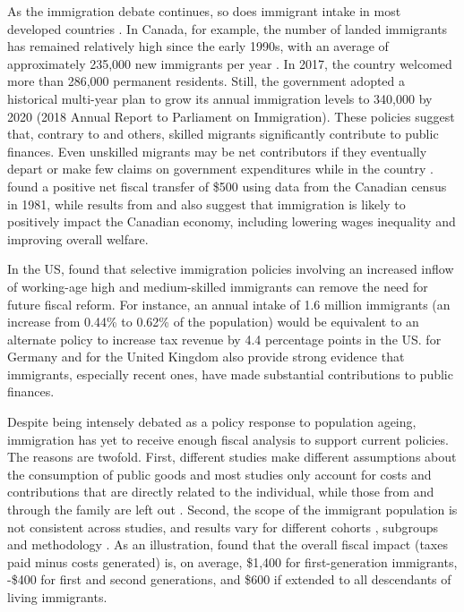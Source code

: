 \vspace{0.7em}\par
As the immigration debate continues, so does immigrant intake in most developed countries \citep{Card:2016ku}.
In Canada, for example, the number of landed immigrants has remained relatively high since the early 1990s, with an average of approximately 235,000 new immigrants per year \citep{StatistiqueCanada:2016ud}.
In 2017, the country welcomed more than 286,000 permanent residents. Still, the government adopted a historical multi-year plan to grow its annual immigration levels to 340,000 by 2020 (2018 Annual Report to Parliament on Immigration).
These policies suggest that, contrary to \citet{Borjas:2014hr} and others, skilled migrants significantly contribute to public finances. Even unskilled migrants may be net contributors if they eventually depart or make few claims on government expenditures while in the country \citep{Rowthorn:2008kk}.
\citet{Akbari:1989fh} found a positive net fiscal transfer of \$500 using data from the Canadian census in 1981, while results from \citet{Ileri:2019hf} and \citet{Dungan:2013jp} also suggest that immigration is likely to positively impact the Canadian economy, including lowering wages inequality and improving overall welfare.

\vspace{0.7em}\par
In the US, \citet{Storesletten:2000cn} found that selective immigration policies involving an increased inflow of working-age high and medium-skilled immigrants can remove the need for future fiscal reform.
For instance, an annual intake of 1.6 million immigrants (an increase from 0.44\% to 0.62\% of the population) would be equivalent to an alternate policy to increase tax revenue by 4.4 percentage points in the US.
\citet{Akin:2012gh} for Germany and \citet{Dustmann:2014dr} for the United Kingdom also provide strong evidence that immigrants, especially recent ones, have made substantial contributions to public finances.

\vspace{0.7em}\par
Despite being intensely debated as a policy response to population ageing, immigration has yet to receive enough fiscal analysis to support current policies.
The reasons are twofold.
First, different studies make different assumptions about the consumption of public goods \citep{Grubel:2012wo} and most studies only account for costs and contributions that are directly related to the individual, while those from and through the family are left out \citep{dAlbis:2019de}.
Second, the scope of the immigrant population is not consistent across studies, and results vary for different cohorts \citep{Grubel:2012wo}, subgroups and methodology \citep{Chojnicki:2011vu}.
As an illustration, \citet{Lee:1998fs} found that the overall fiscal impact (taxes paid minus costs generated) is, on average, \$1,400 for first-generation immigrants, -\$400 for first and second generations, and \$600 if extended to all descendants of living immigrants.

